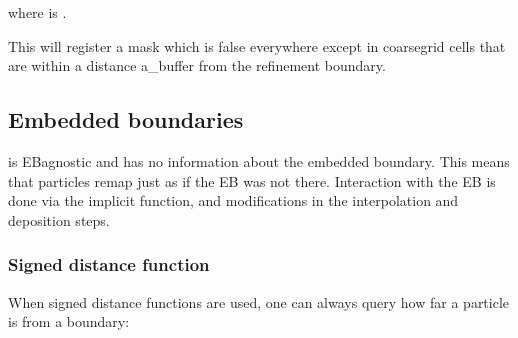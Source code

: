 \documentclass[letterpaper,10pt,english]{sphinxmanual}
\begin{document}
\begin{sphinxVerbatim}[commandchars=\\\{\},formatcom=\scriptsize]
         
\end{sphinxVerbatim}

where  is .

This will register a mask which is false everywhere except in coarse\sphinxhyphen{}grid cells that are within a distance a\_buffer from the refinement boundary.


\subsection{Embedded boundaries}
\label{\detokenize{Source/Particles:embedded-boundaries}}
 is EB\sphinxhyphen{}agnostic and has no information about the embedded boundary.
This means that particles remap just as if the EB was not there.
Interaction with the EB is done via the implicit function, and modifications in the interpolation and deposition steps.


\subsubsection{Signed distance function}
\label{\detokenize{Source/Particles:signed-distance-function}}
When signed distance functions are used, one can always query how far a particle is from a boundary:

\begin{sphinxVerbatim}[commandchars=\\\{\},formatcom=\scriptsize]
 
 

    
                
       

       
\end{sphinxVerbatim}
\end{document}
